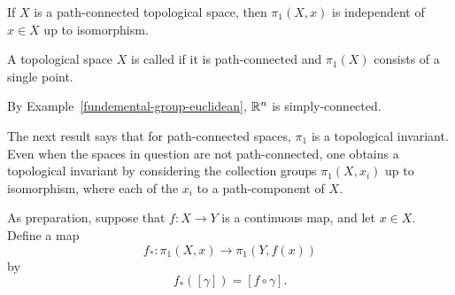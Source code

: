 \begin{cor}
  If $X$ is a path-connected topological space, then $\pi_1(X,x)$ is independent of $x \in X$ up to isomorphism.
\end{cor}
\begin{defn}
  A topological space $X$ is called  if it is path-connected and $\pi_1(X)$ consists of a single point.
\end{defn}
\begin{example}
  By Example~\ref{fundemental-group-euclidean}, $\mathbb{R}^n$ is simply-connected.
\end{example}

The next result says that for path-connected spaces, $\pi_1$ is a topological invariant. Even when the spaces in question are not path-connected, one obtains a topological invariant by considering the collection groups $\pi_1(X,x_i)$ up to isomorphism, where each of the $x_i$ to a path-component of $X$.

As preparation, suppose that $f : X \to Y$ is a continuous map, and let $x \in X$. Define a map
\[
  f_* : \pi_1(X,x) \to \pi_1(Y,f(x))
\]
by
\[
  f_*([\gamma]) = [f \circ \gamma].
\]

